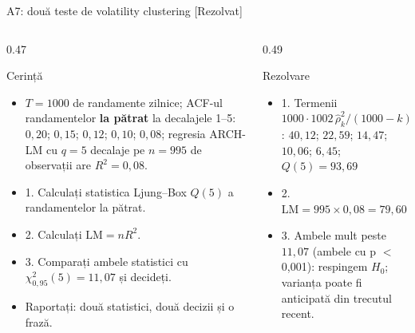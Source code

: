 \begin{frame}{A7: două teste de volatility clustering [Rezolvat]}
\itemsize{\scriptsize}
\begin{columns}[T]
\begin{column}{0.47\textwidth}
\begin{block}{Cerință}
\begin{itemize}
    \item $T = 1000$ de randamente zilnice; ACF-ul randamentelor \textbf{la pătrat} la decalajele 1--5: $0{,}20$; $0{,}15$; $0{,}12$; $0{,}10$; $0{,}08$; regresia ARCH-LM cu $q = 5$ decalaje pe $n = 995$ de observații are $R^2 = 0{,}08$.
    \item 1. Calculați statistica Ljung--Box $Q(5)$ a randamentelor la pătrat.
    \item 2. Calculați $\mathrm{LM} = nR^2$.
    \item 3. Comparați ambele statistici cu $\chi^2_{0{,}95}(5) = 11{,}07$ și decideți.
    \item Raportați: două statistici, două decizii și o frază.
\end{itemize}
\end{block}
\end{column}
\begin{column}{0.49\textwidth}
\begin{exampleblock}{Rezolvare}
\begin{itemize}
    \item 1. Termenii $1000 \cdot 1002\,\hat\rho_k^2/(1000 - k)$: $40{,}12$; $22{,}59$; $14{,}47$; $10{,}06$; $6{,}45$; $Q(5) = 93{,}69$
    \item 2. $\mathrm{LM} = 995 \times 0{,}08 = 79{,}60$
    \item 3. Ambele mult peste $11{,}07$ (ambele cu p $<$\,0{,}001): respingem $H_0$; varianța poate fi anticipată din trecutul recent.
\end{itemize}
\end{exampleblock}
\end{column}
\end{columns}
\end{frame}

